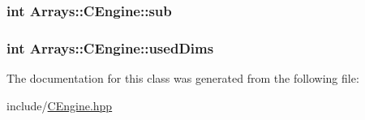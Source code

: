 \subsubsection[{sub}]{\setlength{\rightskip}{0pt plus 5cm}int Arrays\+::\+C\+Engine\+::sub\hspace{0.3cm}{\ttfamily [private]}}\label{classArrays_1_1CEngine_a715713478e9c4b91563aae379b37f6aa}
\hypertarget{classArrays_1_1CEngine_acbef4a69f246b49bff8ec52ca92d0e1e}{}
\subsubsection[{used\+Dims}]{\setlength{\rightskip}{0pt plus 5cm}int Arrays\+::\+C\+Engine\+::used\+Dims\hspace{0.3cm}{\ttfamily [private]}}\label{classArrays_1_1CEngine_acbef4a69f246b49bff8ec52ca92d0e1e}


The documentation for this class was generated from the following file\+:\begin{DoxyCompactItemize}
\item 
include/\hyperlink{CEngine_8hpp}{C\+Engine.\+hpp}\end{DoxyCompactItemize}
